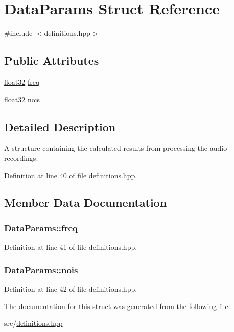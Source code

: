 \hypertarget{structDataParams}{\section{Data\+Params Struct Reference}
\label{structDataParams}
}


{\ttfamily \#include $<$definitions.\+hpp$>$}

\subsection*{Public Attributes}
\begin{DoxyCompactItemize}
\item 
\hyperlink{definitions_8hpp_aacdc525d6f7bddb3ae95d5c311bd06a1}{float32} \hyperlink{structDataParams_a12566e017407647bc8287d62554ad3fb}{freq}
\item 
\hyperlink{definitions_8hpp_aacdc525d6f7bddb3ae95d5c311bd06a1}{float32} \hyperlink{structDataParams_ad85d10f8f222c0cd7eb09560a9aedf28}{nois}
\end{DoxyCompactItemize}


\subsection{Detailed Description}
A structure containing the calculated results from processing the audio recordings. 

Definition at line 40 of file definitions.\+hpp.



\subsection{Member Data Documentation}
\hypertarget{structDataParams_a12566e017407647bc8287d62554ad3fb}{
\subsubsection[{freq}]{ Data\+Params\+::freq}}\label{structDataParams_a12566e017407647bc8287d62554ad3fb}


Definition at line 41 of file definitions.\+hpp.

\hypertarget{structDataParams_ad85d10f8f222c0cd7eb09560a9aedf28}{
\subsubsection[{nois}]{ Data\+Params\+::nois}}\label{structDataParams_ad85d10f8f222c0cd7eb09560a9aedf28}


Definition at line 42 of file definitions.\+hpp.



The documentation for this struct was generated from the following file\+:\begin{DoxyCompactItemize}
\item 
src/\hyperlink{definitions_8hpp}{definitions.\+hpp}\end{DoxyCompactItemize}
